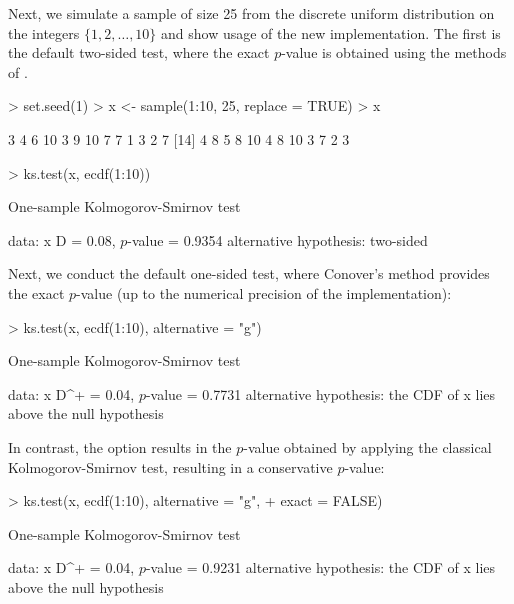 Next, we simulate a sample of size 25 from the discrete uniform distribution on
the integers $\{1, 2, \ldots, 10\}$ and show usage of the
new  implementation.  The first is the default two-sided test,
where the exact $p$-value is obtained using the methods of \citet{gleser85}.
\begin{Schunk}
\begin{Sinput}
> set.seed(1)
> x <- sample(1:10, 25, replace = TRUE)
> x
\end{Sinput}
\begin{Soutput}
 [1]  3  4  6 10  3  9 10  7  7  1  3  2  7
[14]  4  8  5  8 10  4  8 10  3  7  2  3
\end{Soutput}
\begin{Sinput}
> ks.test(x, ecdf(1:10))
\end{Sinput}
\begin{Soutput}
	One-sample Kolmogorov-Smirnov test

data:  x 
D = 0.08, $p$-value = 0.9354
alternative hypothesis: two-sided 
\end{Soutput}
\end{Schunk}
Next, we conduct the default one-sided test, where Conover's method
provides the exact $p$-value (up to the numerical precision of the
implementation):
\begin{Schunk}
\begin{Sinput}
> ks.test(x, ecdf(1:10), alternative = "g")
\end{Sinput}
\begin{Soutput}
	One-sample Kolmogorov-Smirnov test

data:  x 
D^+ = 0.04, $p$-value = 0.7731
alternative hypothesis:
the CDF of x lies above the null hypothesis 
\end{Soutput}
\end{Schunk}
In contrast, the option  results in the
$p$-value obtained by applying the classical Kolmogorov-Smirnov
test, resulting in a conservative $p$-value:
\begin{Schunk}
\begin{Sinput}
> ks.test(x, ecdf(1:10), alternative = "g", 
+         exact = FALSE)
\end{Sinput}
\begin{Soutput}
	One-sample Kolmogorov-Smirnov test

data:  x 
D^+ = 0.04, $p$-value = 0.9231
alternative hypothesis:
the CDF of x lies above the null hypothesis 
\end{Soutput}
\end{Schunk}

